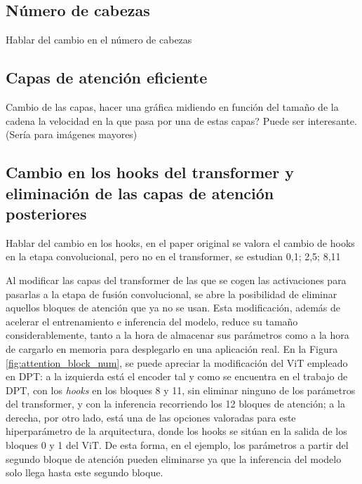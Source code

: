 
\subsection{Número de cabezas}
Hablar del cambio en el número de cabezas

\subsection{Capas de atención eficiente}
Cambio de las capas, hacer una gráfica midiendo en función del tamaño de la cadena la velocidad en la que pasa por una de estas capas? Puede ser interesante. (Sería para imágenes mayores)


\subsection{Cambio en los hooks del transformer y eliminación de las capas de atención posteriores}

Hablar del cambio en los hooks, en el paper original se valora el cambio de hooks en la etapa convolucional, pero no en el transformer, se estudian 0,1; 2,5; 8,11

Al modificar las capas del transformer de las que se cogen las activaciones para pasarlas a la etapa de fusión convolucional, se abre la posibilidad de eliminar aquellos bloques de atención que ya no se usan. Esta modificación, además de acelerar el entrenamiento e inferencia del modelo, reduce su tamaño considerablemente, tanto a la hora de almacenar sus parámetros como a la hora de cargarlo en memoria para desplegarlo en una aplicación real. En la Figura \ref{fig:attention_block_num}, se puede apreciar la modificación del ViT empleado en DPT: a la izquierda está el encoder tal y como se encuentra en el trabajo de DPT, con los \textit{hooks} en los bloques 8 y 11, sin eliminar ninguno de los parámetros del transformer, y con la inferencia recorriendo los 12 bloques de atención; a la derecha, por otro lado, está una de las opciones valoradas para este hiperparámetro de la arquitectura, donde los hooks se sitúan en la salida de los bloques 0 y 1 del ViT. De esta forma, en el ejemplo, los parámetros a partir del segundo bloque de atención pueden eliminarse ya que la inferencia del modelo solo llega hasta este segundo bloque.

